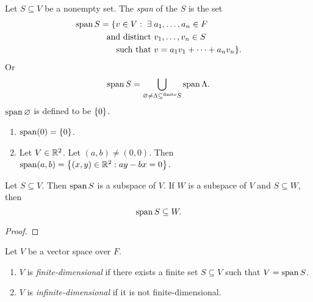
\begin{defn} \label{defn:vector:span:set}
    Let $S \subseteq V$ be a nonempty set. The \emph{span} of the $S$ is the set \begin{align*}
        \operatorname{span} S = \{v \in V : \;\exists\; &a_1, \dots, a_n \in F \\
        \text{and distinct } &v_1, \dots, v_n \in S \\
        \text{such that } &v = a_1 v_1 + \cdots + a_n v_n\}.
    \end{align*}
    Or \[
        \operatorname{span} S = \bigcup_{\varnothing \neq \Lambda \subseteq ^{\mathrm{finite}} S} \operatorname{span} \Lambda.
    \]
    $\operatorname{span} \varnothing$ is defined to be $\set{0}$.
\end{defn}

\begin{example}
    \begin{enumerate}[label=(\alph*)]
        \item $\spann(0) = \set{0}$.
        \item Let $V \in \mathbb{R}^{2}$.
        Let $(a, b) \neq (0, 0)$.
        Then $\spann (a, b) = \set{(x, y) \in \R^{2} : ay - bx = 0}$.

    \end{enumerate}
\end{example}

\begin{prop} \label{thm:vector:span:subspace}
    Let $S \subseteq V$.
    Then $\operatorname{span} S$ is a subspace of $V$.
    If $W$ is a subspace of $V$ and $S \subseteq W$, then \[
        \operatorname{span} S \subseteq W.
    \]
\end{prop}
\begin{proof}
    
\end{proof}

\begin{defn} \label{defn:vector:fdvs}
    Let $V$ be a vector space over $F$.
    \begin{enumerate}[label=(\alph*)]
        \item $V$ is \emph{finite-dimensional} if there exists a finite set $S \subseteq V$ such that $V = \operatorname{span} S$.
        \item $V$ is \emph{infinite-dimensional} if it is not finite-dimensional.
    \end{enumerate}
\end{defn}
